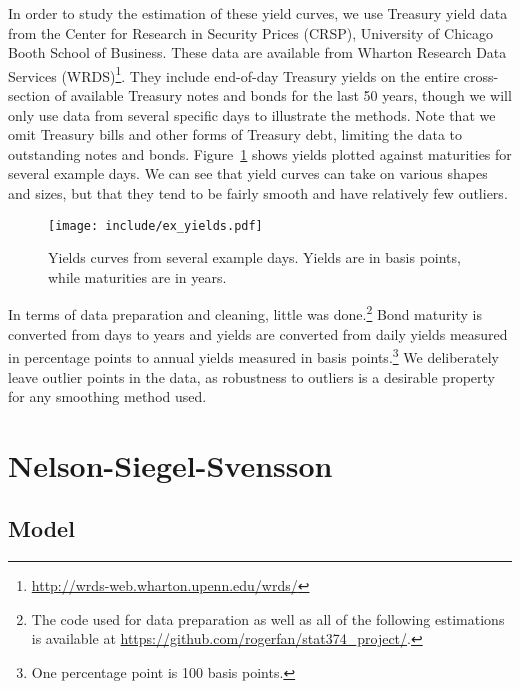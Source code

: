 \documentclass[12pt]{article}
\begin{document}
In order to study the estimation of these yield curves, we use Treasury yield data from the Center for Research in Security Prices (CRSP), University of Chicago Booth School of Business. These data are available from Wharton Research Data Services (WRDS)\footnote{\url{http://wrds-web.wharton.upenn.edu/wrds/}}. They include end-of-day Treasury yields on the entire cross-section of available Treasury notes and bonds for the last 50 years, though we will only use data from several specific days to illustrate the methods. Note that we omit Treasury bills and other forms of Treasury debt, limiting the data to outstanding notes and bonds. Figure~\ref{fig:ex_yields} shows yields plotted against maturities for several example days. We can see that yield curves can take on various shapes and sizes, but that they tend to be fairly smooth and have relatively few outliers.

\begin{figure}[htb]
    \centering
    \texttt{[image: include/ex\_yields.pdf]}
    \caption{Yields curves from several example days. Yields are in basis points, while maturities are in years.}
    \label{fig:ex_yields}
\end{figure}

In terms of data preparation and cleaning, little was done.\footnote{The code used for data preparation as well as all of the following estimations is available at \url{https://github.com/rogerfan/stat374_project/}.} Bond maturity is converted from days to years and yields are converted from daily yields measured in percentage points to annual yields measured in basis points.\footnote{One percentage point is 100 basis points.} We deliberately leave outlier points in the data, as robustness to outliers is a desirable property for any smoothing method used.


\section{Nelson-Siegel-Svensson}

\subsection{Model}
\end{document}

